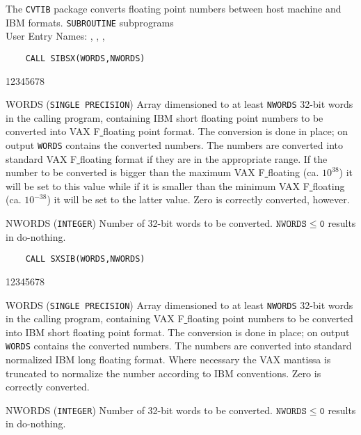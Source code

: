                  
            
\Submitter{}                     
             
The {\tt CVTIB} package converts floating point numbers between host
machine and IBM formats.
\Structure
{\tt SUBROUTINE} subprograms \\
User Entry  Names:  , , ,
\Usage
\begin{verbatim}
    CALL SIBSX(WORDS,NWORDS)
\end{verbatim}
\begin{DLtt}{12345678}
\item [WORDS] ({\tt SINGLE PRECISION}) Array dimensioned to at least
{\tt NWORDS} 32-bit words in the calling program, containing IBM short
floating point numbers to be converted into VAX F\underline{ }floating
point format. The conversion is done in place; on output {\tt WORDS}
contains the converted numbers. The numbers are converted into standard
VAX F\underline{ }floating format if they are in the appropriate range.
If the number to be converted is bigger than the maximum
VAX F\underline{ }floating (ca. $10^{38}$) it will be set to this value
while if it is smaller than the minimum VAX F\underline{ }floating
(ca. $10^{-38}$) it will be set to the latter value.
Zero is correctly converted, however.
\item [NWORDS] ({\tt INTEGER}) Number of 32-bit words to be converted.
$\mathtt{NWORDS \leq 0}$ results in do-nothing.
\end{DLtt}
\begin{verbatim}
    CALL SXSIB(WORDS,NWORDS)
\end{verbatim}
\begin{DLtt}{12345678}
\item [WORDS] ({\tt SINGLE PRECISION}) Array dimensioned to at least
{\tt NWORDS} 32-bit words in the calling program, containing
VAX F\underline{ }floating
point numbers to be converted into IBM short floating point format. The
conversion is done in place; on output {\tt WORDS} contains the converted
numbers. The numbers are converted into standard normalized IBM long
floating format. Where necessary the VAX mantissa is truncated to
normalize the number according to IBM conventions. Zero is correctly
converted.
\item [NWORDS] ({\tt INTEGER}) Number of 32-bit words to be converted.
$\mathtt{NWORDS \leq 0}$ results in do-nothing.
\end{DLtt}
